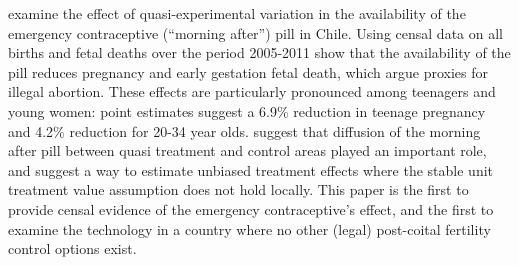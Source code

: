 \vspace{-5mm}
\begin{chapabstract}
\Person examine the effect of quasi-experimental variation in the availability
of the emergency contraceptive (``morning after'') pill in Chile.  Using censal
data on all births and fetal deaths over the period 2005-2011 \person show that
the availability of the pill reduces pregnancy and early gestation fetal death,
which \person argue proxies for illegal abortion.  These effects are 
particularly pronounced among teenagers and young women: point estimates suggest
a 6.9\% reduction in teenage pregnancy and 4.2\% reduction for 20-34 year olds.   
\Person suggest that diffusion of the morning after pill between quasi treatment 
and control areas played an important role, and suggest a way to estimate 
unbiased treatment effects where the stable unit treatment value assumption does 
not hold locally.  This paper is the first to provide censal evidence of the
emergency contraceptive's effect, and the first to examine the technology in a
country where no other (legal) post-coital fertility control options exist. \\
\JELs
\end{chapabstract}

